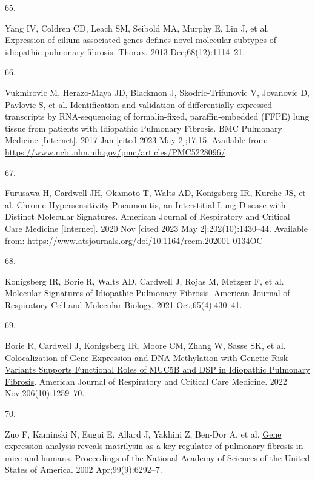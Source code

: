 \documentclass[
]{article}
\newlength{\cslhangindent}
\newlength{\csllabelwidth}
\newenvironment{CSLReferences}[2] %
 {\begin{list}{}{%
  \setlength{\itemindent}{0pt}
  \setlength{\leftmargin}{0pt}
  \setlength{\parsep}{0pt}
  \ifodd #1
   \setlength{\leftmargin}{\cslhangindent}
   \setlength{\itemindent}{-1\cslhangindent}
  \fi
  \setlength{\itemsep}{#2\baselineskip}}}
 {\end{list}}
\newcommand{\CSLLeftMargin}[1]{\parbox[t]{\csllabelwidth}{\strut#1\strut}}
\newcommand{\CSLRightInline}[1]{\parbox[t]{\linewidth - \csllabelwidth}{\strut#1\strut}}
\begin{document}
\begin{CSLReferences}{0}{1}
\CSLLeftMargin{65. }%
\CSLRightInline{Yang IV, Coldren CD, Leach SM, Seibold MA, Murphy E, Lin J, et al. \href{https://doi.org/10.1136/thoraxjnl-2012-202943}{Expression of cilium-associated genes defines novel molecular subtypes of idiopathic pulmonary fibrosis}. Thorax. 2013 Dec;68(12):1114--21. }

\CSLLeftMargin{66. }%
\CSLRightInline{Vukmirovic M, Herazo-Maya JD, Blackmon J, Skodric-Trifunovic V, Jovanovic D, Pavlovic S, et al. Identification and validation of differentially expressed transcripts by {RNA}-sequencing of formalin-fixed, paraffin-embedded ({FFPE}) lung tissue from patients with {Idiopathic} {Pulmonary} {Fibrosis}. BMC Pulmonary Medicine {[}Internet{]}. 2017 Jan {[}cited 2023 May 2{]};17:15. Available from: \url{https://www.ncbi.nlm.nih.gov/pmc/articles/PMC5228096/}}

\CSLLeftMargin{67. }%
\CSLRightInline{Furusawa H, Cardwell JH, Okamoto T, Walts AD, Konigsberg IR, Kurche JS, et al. Chronic {Hypersensitivity} {Pneumonitis}, an {Interstitial} {Lung} {Disease} with {Distinct} {Molecular} {Signatures}. American Journal of Respiratory and Critical Care Medicine {[}Internet{]}. 2020 Nov {[}cited 2023 May 2{]};202(10):1430--44. Available from: \url{https://www.atsjournals.org/doi/10.1164/rccm.202001-0134OC}}

\CSLLeftMargin{68. }%
\CSLRightInline{Konigsberg IR, Borie R, Walts AD, Cardwell J, Rojas M, Metzger F, et al. \href{https://doi.org/10.1165/rcmb.2020-0546OC}{Molecular {Signatures} of {Idiopathic} {Pulmonary} {Fibrosis}}. American Journal of Respiratory Cell and Molecular Biology. 2021 Oct;65(4):430--41. }

\CSLLeftMargin{69. }%
\CSLRightInline{Borie R, Cardwell J, Konigsberg IR, Moore CM, Zhang W, Sasse SK, et al. \href{https://doi.org/10.1164/rccm.202110-2308OC}{Colocalization of {Gene} {Expression} and {DNA} {Methylation} with {Genetic} {Risk} {Variants} {Supports} {Functional} {Roles} of {MUC5B} and {DSP} in {Idiopathic} {Pulmonary} {Fibrosis}}. American Journal of Respiratory and Critical Care Medicine. 2022 Nov;206(10):1259--70. }

\CSLLeftMargin{70. }%
\CSLRightInline{Zuo F, Kaminski N, Eugui E, Allard J, Yakhini Z, Ben-Dor A, et al. \href{https://doi.org/10.1073/pnas.092134099}{Gene expression analysis reveals matrilysin as a key regulator of pulmonary fibrosis in mice and humans}. Proceedings of the National Academy of Sciences of the United States of America. 2002 Apr;99(9):6292--7. }


\end{CSLReferences}
\end{document}
